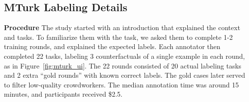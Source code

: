 \subsection{MTurk Labeling Details}
\label{appendix:label_instruct}


\textbf{Procedure}
The study started with an introduction that explained the context and tasks.
To familiarize them with the task, we asked them to complete 1-2 training rounds, and explained the expected labels.
Each annotator then completed 22 tasks, labeling 3 counterfactuals of a single example in each round, as in Figure~\ref{fig:mturk_ui}.
The 22 rounds consisted of 20 actual labeling tasks and 2 extra ``gold rounds'' with known correct labels.
The gold cases later served to filter low-quality crowdworkers.
The median annotation time was around 15 minutes, and participants received \$2.5.

